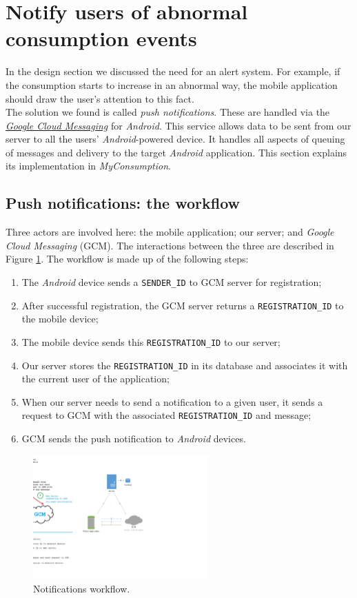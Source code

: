 \documentclass[a4paper, oneside, 11pt]{book}
\begin{document}
\section{Notify users of abnormal consumption events}
In the design section we discussed the need for an alert system. For example, if the consumption starts to increase in an abnormal way, the mobile application should draw the user’s attention to this fact. \\

The solution we found is called \emph{push notifications}. These are handled via the \href{https://developer.android.com/google/gcm/index.html}{\textit{Google Cloud Messaging}} for \textit{Android}. This service allows data to be sent from our server to all the users' \textit{Android}-powered device. It handles all aspects of queuing of messages and delivery to the target \textit{Android} application. This section explains its implementation in \textit{MyConsumption}.

\subsection{Push notifications: the workflow}
Three actors are involved here: the mobile application; our server; and \textit{Google Cloud Messaging} (GCM). The interactions between the three are described in Figure \ref{fig:notifs}. The workflow is made up of the following steps:

\begin{enumerate}
	\item The \textit{Android} device sends a \texttt{SENDER\_ID} to GCM server for registration;
	\item After successful registration, the GCM server returns a \texttt{REGISTRATION\_ID} to the mobile device;
	\item The mobile device sends this \texttt{REGISTRATION\_ID} to our server;
	\item Our server stores the \texttt{REGISTRATION\_ID} in its database and associates it with the current user of the application;
	\item When our server needs to send a notification to a given user, it sends a request to GCM with the associated \texttt{REGISTRATION\_ID} and message;
	\item GCM sends the push notification to \textit{Android} devices.
\end{enumerate}

\begin{figure}[htbp]
	\centerline{\includegraphics[width=0.6\textwidth]{notifs.pdf}}
	\caption{Notifications workflow.}
	\label{fig:notifs}
\end{figure}
\end{document}
